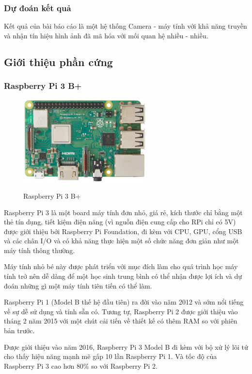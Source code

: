 \documentclass{article}
\begin{document}
\subsubsection{Dự đoán kết quả }
Kết quả của bài báo cáo là một hệ thống Camera - máy tính với khả năng truyền và nhận tín hiệu hình ảnh đã mã hóa với mối quan hệ nhiều - nhiều.
\par
\subsection{Giới thiệu phần cứng}
\subsubsection{Raspberry Pi 3 B+}

\begin{figure}[ht]
\centering
\includegraphics[width=0.6\textwidth]{rasp-pi.jpg}
\label{rasp-pi}
\caption{Raspberry Pi 3 B+}
\end{figure}

Raspberry Pi 3 là một board máy tính đơn nhỏ, giá rẻ, kích thước chỉ bằng một thẻ tín dụng, tiết kiệm điện năng (vì nguồn điện cung cấp cho RPi chỉ có 5V) được giới thiệu bởi Raspberry Pi Foundation, đi kèm với CPU, GPU, cổng USB và các chân I/O và có khả năng thực hiện một số chức năng đơn giản như một máy tính thông thường.

Máy tính nhỏ bé này được phát triển với mục đích làm cho quá trình học máy tính trở nên dễ dàng để một học sinh trung bình có thể nhận được lợi ích và dự đoán những gì một máy tính tiên tiến có thể làm.

Raspberry Pi 1 (Model B thế hệ đầu tiên) ra đời vào năm 2012 và sớm nổi tiếng về sự dễ sử dụng và tính sẵn có. Tương tự, Raspberry Pi 2 được giới thiệu vào tháng 2 năm 2015 với một chút cải tiến về thiết kế có thêm RAM so với phiên bản trước.

Được giới thiệu vào năm 2016, Raspberry Pi 3 Model B đi kèm với bộ xử lý lõi tứ cho thấy hiệu năng mạnh mẽ gấp 10 lần Raspberry Pi 1. Và tốc độ của Raspberry Pi 3 cao hơn 80\% so với Raspberry Pi 2.
\end{document}
